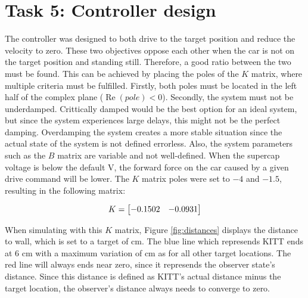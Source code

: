 \documentclass[final]{scrreprt} %
\begin{document}
\section*{Task 5: Controller design}
The controller was designed to both drive to the target position and reduce the velocity to zero.
These two objectives oppose each other when the car is not on the target position and standing still.
Therefore, a good ratio between the two must be found.
This can be achieved by placing the poles of the $K$ matrix, where multiple criteria must be fulfilled.
Firstly, both poles must be located in the left half of the complex plane ($\operatorname{Re}(pole) < 0$).
Secondly, the system must not be underdamped.
Crittically damped would be the best option for an ideal system, but since the system experiences large delays, this might not be the perfect damping.
Overdamping the system creates a more stable situation since the actual state of the system is not defined errorless.
Also, the system parameters such as the $B$ matrix are variable and not well-defined.
When the supercap voltage is below the default \unit[20]{V}, the forward force on the car caused by a given drive command will be lower.
The $K$ matrix poles were set to $-4$ and $-1.5$, resulting in the following matrix:

\begin{equation}
\centering
K = 
\begin{bmatrix}
  -0.1502 & -0.0931
\end{bmatrix}
\end{equation}

When simulating with this $K$ matrix, Figure \ref{fig:distances} displays the distance to wall, which is set to a target of \unit[6]{cm}.
The blue line which represends KITT ends at 6 cm with a maximum variation of \unit[1]{cm} as for all other target locations.
The red line will always ends near zero, since it represends the observer state's distance.
Since this distance is defined as KITT's actual distance minus the target location, the observer's distance always needs to converge to zero.
\end{document}
